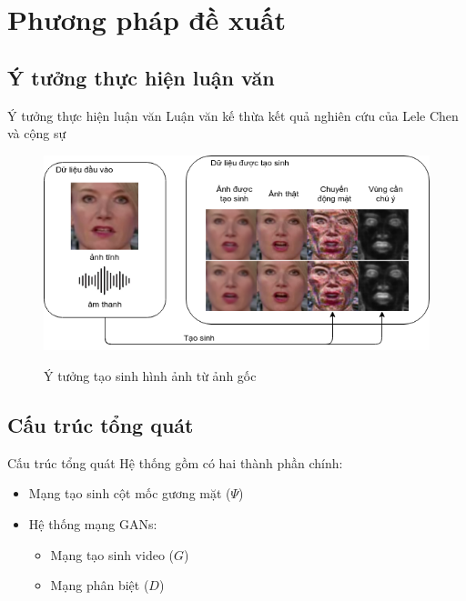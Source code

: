 \section{Phương pháp đề xuất}\label{sec:method}
\frame{\tableofcontents[currentsection]}

\subsection{Ý tưởng thực hiện luận văn}
\begin{frame}{Ý tưởng thực hiện luận văn}
    Luận văn kế thừa kết quả nghiên cứu của Lele Chen và cộng sự \cite{chen2019}
    \begin{figure}[H]
    \centering
    \includegraphics[width=12cm]{images/idea-small.png}
    \label{fig:idea}
    \caption{Ý tưởng tạo sinh hình ảnh từ ảnh gốc}
    \end{figure}
\end{frame}

\subsection{Cấu trúc tổng quát}

\begin{frame}{Cấu trúc tổng quát}
Hệ thống gồm có hai thành phần chính:
\begin{itemize}
    \item Mạng tạo sinh cột mốc gương mặt ($\Psi$)
    \item Hệ thống mạng GANs:
    \begin{itemize}
        \item Mạng tạo sinh video ($G$)
        \item Mạng phân biệt ($D$)
    \end{itemize}
\end{itemize}
\end{frame}

